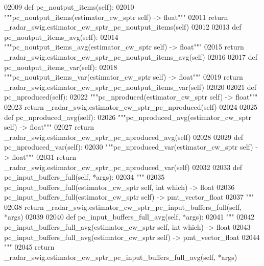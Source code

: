 \begin{DoxyCode}
{{{{{{{{02009     \textcolor{keyword}{def }pc_noutput_items(self):
02010         \textcolor{stringliteral}{"""pc\_noutput\_items(estimator\_cw\_sptr self) -> float"""}
02011         \textcolor{keywordflow}{return} \_radar\_swig.estimator\_cw\_sptr\_pc\_noutput\_items(self)
02012 
02013     \textcolor{keyword}{def }pc_noutput_items_avg(self):
02014         \textcolor{stringliteral}{"""pc\_noutput\_items\_avg(estimator\_cw\_sptr self) -> float"""}
02015         \textcolor{keywordflow}{return} \_radar\_swig.estimator\_cw\_sptr\_pc\_noutput\_items\_avg(self)
02016 
02017     \textcolor{keyword}{def }pc_noutput_items_var(self):
02018         \textcolor{stringliteral}{"""pc\_noutput\_items\_var(estimator\_cw\_sptr self) -> float"""}
02019         \textcolor{keywordflow}{return} \_radar\_swig.estimator\_cw\_sptr\_pc\_noutput\_items\_var(self)
02020 
02021     \textcolor{keyword}{def }pc_nproduced(self):
02022         \textcolor{stringliteral}{"""pc\_nproduced(estimator\_cw\_sptr self) -> float"""}
02023         \textcolor{keywordflow}{return} \_radar\_swig.estimator\_cw\_sptr\_pc\_nproduced(self)
02024 
02025     \textcolor{keyword}{def }pc_nproduced_avg(self):
02026         \textcolor{stringliteral}{"""pc\_nproduced\_avg(estimator\_cw\_sptr self) -> float"""}
02027         \textcolor{keywordflow}{return} \_radar\_swig.estimator\_cw\_sptr\_pc\_nproduced\_avg(self)
02028 
02029     \textcolor{keyword}{def }pc_nproduced_var(self):
02030         \textcolor{stringliteral}{"""pc\_nproduced\_var(estimator\_cw\_sptr self) -> float"""}
02031         \textcolor{keywordflow}{return} \_radar\_swig.estimator\_cw\_sptr\_pc\_nproduced\_var(self)
02032 
02033     \textcolor{keyword}{def }pc_input_buffers_full(self, *args):
02034         \textcolor{stringliteral}{"""}
02035 \textcolor{stringliteral}{        pc\_input\_buffers\_full(estimator\_cw\_sptr self, int which) -> float}
02036 \textcolor{stringliteral}{        pc\_input\_buffers\_full(estimator\_cw\_sptr self) -> pmt\_vector\_float}
02037 \textcolor{stringliteral}{        """}
02038         \textcolor{keywordflow}{return} \_radar\_swig.estimator\_cw\_sptr\_pc\_input\_buffers\_full(self, *args)
02039 
02040     \textcolor{keyword}{def }pc_input_buffers_full_avg(self, *args):
02041         \textcolor{stringliteral}{"""}
02042 \textcolor{stringliteral}{        pc\_input\_buffers\_full\_avg(estimator\_cw\_sptr self, int which) -> float}
02043 \textcolor{stringliteral}{        pc\_input\_buffers\_full\_avg(estimator\_cw\_sptr self) -> pmt\_vector\_float}
02044 \textcolor{stringliteral}{        """}
02045         \textcolor{keywordflow}{return} \_radar\_swig.estimator\_cw\_sptr\_pc\_input\_buffers\_full\_avg(self, *args)
}}}}}}}}
\end{DoxyCode}
